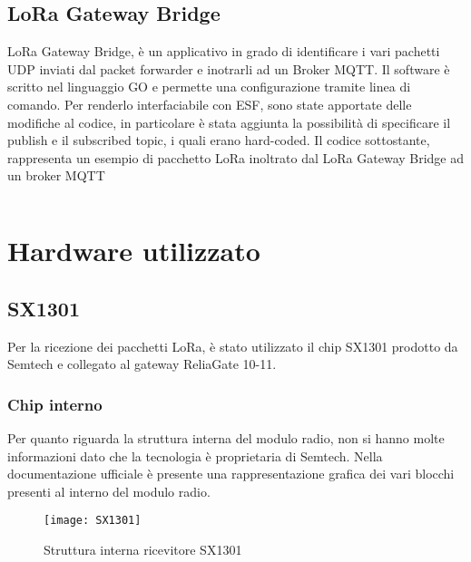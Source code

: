 \subsection{LoRa Gateway Bridge}
LoRa Gateway Bridge, è un applicativo in grado di identificare i vari pachetti UDP inviati
dal packet forwarder e inotrarli ad un Broker MQTT. 
Il software è scritto nel linguaggio GO e permette una configurazione tramite
linea di comando.  Per renderlo interfaciabile con ESF, sono state apportate delle 
modifiche al codice, in particolare è stata aggiunta la possibilità di
specificare il publish e il subscribed topic, i quali erano hard-coded.
Il codice sottostante, rappresenta un esempio di pacchetto LoRa inoltrato dal
LoRa Gateway Bridge ad un broker MQTT
\inputminted[mathescape, gobble=2, frame=lines, linenos=true
framesep=2mm, firstline=1,lastline=23]{json}{Code_Files/message.json}
\section{Hardware utilizzato}

\subsection{SX1301}
Per la ricezione dei pacchetti LoRa, è stato utilizzato il chip SX1301 prodotto
da Semtech e collegato al gateway ReliaGate 10-11.
\subsubsection{Chip interno}
Per quanto riguarda la struttura interna del modulo radio, non si hanno molte
informazioni dato che la tecnologia è proprietaria di Semtech. Nella
documentazione ufficiale è presente una rappresentazione grafica dei vari
blocchi presenti al interno del modulo radio.

\begin{figure}[h]
        \centering 
                \texttt{[image: SX1301]}
        \caption{Struttura interna ricevitore SX1301}
        \label{fig:sx1301}
\end{figure}

